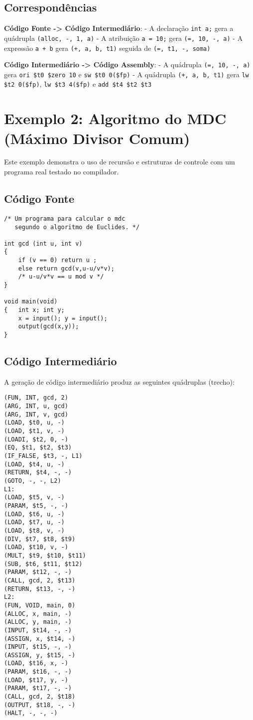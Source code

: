 \documentclass[
	12pt,				%
	oneside,
	a4paper,			%
	english,			%
	french,				%
	spanish,			%
	brazil,				%
	]{abntex2}
\begin{document}
\subsection{Correspondências}

\textbf{Código Fonte -> Código Intermediário}:
- A declaração \texttt{int a;} gera a quádrupla \texttt{(alloc, -, 1, a)}
- A atribuição \texttt{a = 10;} gera \texttt{(=, 10, -, a)}
- A expressão \texttt{a + b} gera \texttt{(+, a, b, t1)} seguida de \texttt{(=, t1, -, soma)}

\textbf{Código Intermediário -> Código Assembly}:
- A quádrupla \texttt{(=, 10, -, a)} gera \texttt{ori \$t0 \$zero 10} e \texttt{sw \$t0 0(\$fp)}
- A quádrupla \texttt{(+, a, b, t1)} gera \texttt{lw \$t2 0(\$fp)}, \texttt{lw \$t3 4(\$fp)} e \texttt{add \$t4 \$t2 \$t3}

\section{Exemplo 2: Algoritmo do MDC (Máximo Divisor Comum)}

Este exemplo demonstra o uso de recursão e estruturas de controle com um programa real testado no compilador.

\subsection{Código Fonte}

\begin{lstlisting}[style=cstyle, caption=Exemplo 2: Código fonte C- (gcd.cm)]
/* Um programa para calcular o mdc
   segundo o algoritmo de Euclides. */

int gcd (int u, int v)
{       
    if (v == 0) return u ;
    else return gcd(v,u-u/v*v);
    /* u-u/v*v == u mod v */
}

void main(void)
{   int x; int y;
    x = input(); y = input();
    output(gcd(x,y));
}
\end{lstlisting}

\subsection{Código Intermediário}

A geração de código intermediário produz as seguintes quádruplas (trecho):

\begin{lstlisting}[style=cstyle, caption=Exemplo 2: Código intermediário (quádruplas)]
(FUN, INT, gcd, 2)
(ARG, INT, u, gcd)
(ARG, INT, v, gcd)
(LOAD, $t0, u, -)
(LOAD, $t1, v, -)
(LOADI, $t2, 0, -)
(EQ, $t1, $t2, $t3)
(IF_FALSE, $t3, -, L1)
(LOAD, $t4, u, -)
(RETURN, $t4, -, -)
(GOTO, -, -, L2)
L1:
(LOAD, $t5, v, -)
(PARAM, $t5, -, -)
(LOAD, $t6, u, -)
(LOAD, $t7, u, -)
(LOAD, $t8, v, -)
(DIV, $t7, $t8, $t9)
(LOAD, $t10, v, -)
(MULT, $t9, $t10, $t11)
(SUB, $t6, $t11, $t12)
(PARAM, $t12, -, -)
(CALL, gcd, 2, $t13)
(RETURN, $t13, -, -)
L2:
(FUN, VOID, main, 0)
(ALLOC, x, main, -)
(ALLOC, y, main, -)
(INPUT, $t14, -, -)
(ASSIGN, x, $t14, -)
(INPUT, $t15, -, -)
(ASSIGN, y, $t15, -)
(LOAD, $t16, x, -)
(PARAM, $t16, -, -)
(LOAD, $t17, y, -)
(PARAM, $t17, -, -)
(CALL, gcd, 2, $t18)
(OUTPUT, $t18, -, -)
(HALT, -, -, -)
\end{lstlisting}
\end{document}
